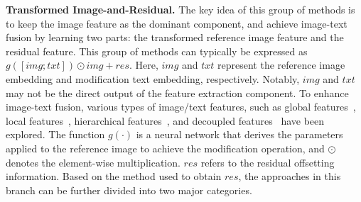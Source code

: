 \textbf{Transformed Image-and-Residual.} The key idea of this group of methods is to keep the image feature as the dominant component, and achieve image-text fusion by learning two parts: the transformed reference image feature and the residual feature.
This group of methods can typically be expressed as \underline{$g\left( \left[\mathit{img};\mathit{txt}\right] \right) \odot \mathit{img} + \mathit{res}$}. Here, $\mathit{img}$ and $\mathit{txt}$ represent the reference image embedding and modification text embedding, respectively. Notably, $\mathit{img}$ and $\mathit{txt}$ may not be the direct output of the feature extraction component. 
To enhance image-text fusion, various types of image/text features, such as global features~\cite{vo2019tirg, chen2020jvsm,chen2023ranking,zhang2024mcem,xu2024alret}, local features~\cite{liu2021mgf,zhang2022eer,lee2021cosmo}, hierarchical features~\cite{chen2020val,kim2021dcnet,wen2021clvcnet,yang2023crn,jandial2022sac,zhang2023MLCLSAP,huang2023lgli,huang2024dwc,chen2024spirit,zhang2024cssnet}, and decoupled features~\cite{wen2023tgcir,chawla2021lsc4cir,zhang2023pcasm} have been explored. The function $g\left(\cdot\right)$ is a neural network that derives the parameters applied to the reference image to achieve the modification operation, and $\odot$ denotes the element-wise multiplication. $\mathit{res}$ refers to the residual offsetting information. 
Based on the method used to obtain $\mathit{res}$, the approaches in this branch can be further divided into two major categories. 
